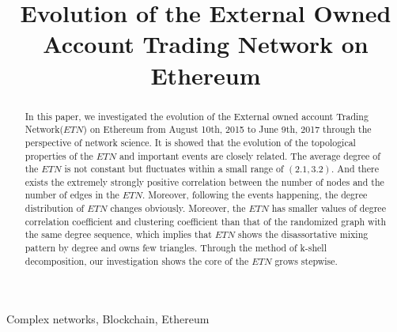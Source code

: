 \documentclass[conference]{IEEEtran}
\begin{document}
\begin{CJK*}{UTF8}{gbsn}

\title{Evolution of the External Owned Account Trading Network on Ethereum\\
}

\author{
\and
{}
}

\maketitle

\begin{abstract}
In this paper, we investigated the evolution of the External owned account Trading Network($ETN$) on Ethereum from August 10th, 2015 to June 9th, 2017 through the perspective of network science. It is showed that the evolution of the topological properties of the $ETN$ and important events are closely related. The average degree of the $ETN$ is not constant but fluctuates within a small range of $(2.1,3.2)$. And there exists the extremely strongly positive correlation between the number of nodes and the number of edges in the $ETN$. Moreover, following the events happening, the degree distribution of $ETN$ changes obviously. Moreover, the $ETN$ has smaller values of degree correlation coefficient and clustering coefficient than that of the randomized graph with the same degree sequence, which implies that $ETN$ shows the disassortative mixing pattern by degree and owns few triangles. Through the method of k-shell decomposition, our investigation shows the core of the $ETN$ grows stepwise.
\end{abstract}

\begin{IEEEkeywords}
Complex networks, Blockchain, Ethereum
\end{IEEEkeywords}


\end{CJK*}
\end{document}
